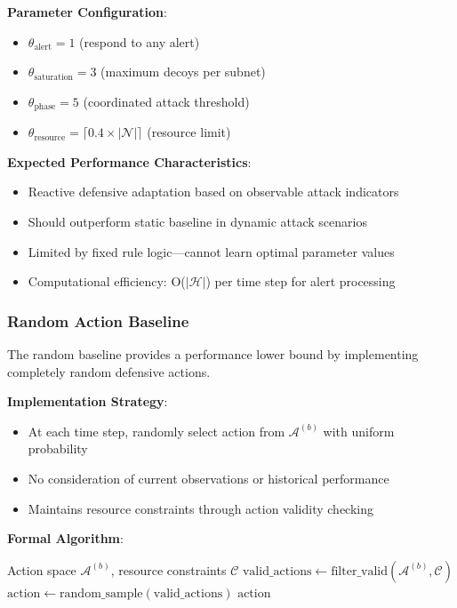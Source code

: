 \documentclass[12pt,oneside]{article}
\begin{document}
\textbf{Parameter Configuration}:
\begin{itemize}
    \item $\theta_{\text{alert}} = 1$ (respond to any alert)
    \item $\theta_{\text{saturation}} = 3$ (maximum decoys per subnet)
    \item $\theta_{\text{phase}} = 5$ (coordinated attack threshold)  
    \item $\theta_{\text{resource}} = \lceil 0.4 \times |\mathcal{N}| \rceil$ (resource limit)
\end{itemize}

\textbf{Expected Performance Characteristics}:
\begin{itemize}
    \item Reactive defensive adaptation based on observable attack indicators
    \item Should outperform static baseline in dynamic attack scenarios
    \item Limited by fixed rule logic—cannot learn optimal parameter values
    \item Computational efficiency: O($|\mathcal{H}|$) per time step for alert processing
\end{itemize}

\subsubsection{Random Action Baseline}

The random baseline provides a performance lower bound by implementing completely random defensive actions.

\textbf{Implementation Strategy}:
\begin{itemize}
    \item At each time step, randomly select action from $\mathcal{A}^{(b)}$ with uniform probability
    \item No consideration of current observations or historical performance
    \item Maintains resource constraints through action validity checking
\end{itemize}

\textbf{Formal Algorithm}:
\begin{algorithm}[H]
\caption{Random Action Baseline}
\label{alg:random_baseline}
\begin{algorithmic}[1]
\REQUIRE Action space $\mathcal{A}^{(b)}$, resource constraints $\mathcal{C}$
\STATE $\text{valid\_actions} \leftarrow \text{filter\_valid}(\mathcal{A}^{(b)}, \mathcal{C})$
\STATE $\text{action} \leftarrow \text{random\_sample}(\text{valid\_actions})$
\RETURN $\text{action}$
\end{algorithmic}
\end{algorithm}
\end{document}
